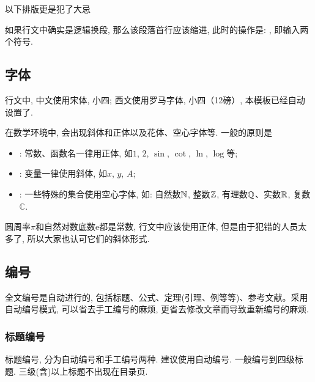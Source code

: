 \documentclass[a4paper,12pt,twoside]{ctexart}
\begin{document}
    以下排版更是犯了大忌\\[10pt]

    如果行文中确实是逻辑换段, 那么该段落首行应该缩进, 此时的操作是: , 即输入两个符号.

    \subsection{字体}
    行文中, 中文使用宋体, 小四; 西文使用罗马字体, 小四（12磅）, 本模板已经自动设置了.

    在数学环境中, 会出现斜体和正体以及花体、空心字体等. 一般的原则是
    \begin{itemize}
      \item {}: 常数、函数名一律用正体, 如$1$, $2$, $\sin $, $\cot$, $\ln$, $\log$等;
      \item {}: 变量一律使用斜体, 如$x$, $y$, $A$;
      \item {}: 一些特殊的集合使用空心字体, 如: 自然数${\mathbb N}$, 整数${\mathbb Z}$, 有理数${\mathbb Q}$、实数${\mathbb R}$, 复数$\mathbb{C}$.
    \end{itemize}

    圆周率$\pi$和自然对数底数e都是常数, 行文中应该使用正体, 但是由于犯错的人员太多了, 所以大家也认可它们的斜体形式.

    \subsection{编号}
    全文编号是自动进行的, 包括标题、公式、定理(引理、例等等)、参考文献。采用自动编号模式, 可以省去手工编号的麻烦, 更省去修改文章而导致重新编号的麻烦.

    \subsubsection{标题编号}
    标题编号, 分为自动编号和手工编号两种. 建议使用自动编号. 一般编号到四级标题. 三级(含)以上标题不出现在目录页.
\end{document}
